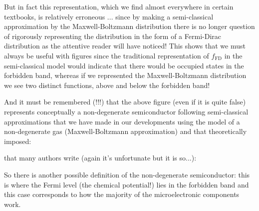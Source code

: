	But in fact this representation, which we find almost everywhere in certain textbooks, is relatively erroneous ... since by making a semi-classical approximation by the Maxwell-Boltzmann distribution there is no longer question of rigorously representing the distribution in the form of a Fermi-Dirac distribution as the attentive reader will have noticed! This shows that we must always be useful with figures since the traditional representation of $f_{\text{FD}}$ in the semi-classical model would indicate that there would be occupied states in the forbidden band, whereas if we represented the Maxwell-Boltzmann distribution we see two distinct functions, above and below the forbidden band!
	
	And it must be remembered (!!!) that the above figure (even if it is quite false) represents conceptually a non-degenerate semiconductor following semi-classical approximations that we have made in our developments using the model of a non-degenerate gas (Maxwell-Boltzmann approximation) and that theoretically imposed:
	
	that many authors write (again it's unfortunate but it is so...):
	 
	So there is another possible definition of the non-degenerate semiconductor: this is where the Fermi level (the chemical potential!) lies in the forbidden band and this case corresponds to how the majority of the microelectronic components work.
	
